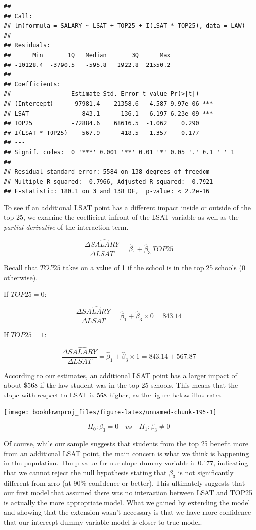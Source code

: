 \documentclass[
]{book}
\begin{document}
\begin{verbatim}
## 
## Call:
## lm(formula = SALARY ~ LSAT + TOP25 + I(LSAT * TOP25), data = LAW)
## 
## Residuals:
##      Min       1Q   Median       3Q      Max 
## -10128.4  -3790.5   -595.8   2922.8  21550.2 
## 
## Coefficients:
##                 Estimate Std. Error t value Pr(>|t|)    
## (Intercept)     -97981.4    21358.6  -4.587 9.97e-06 ***
## LSAT               843.1      136.1   6.197 6.23e-09 ***
## TOP25           -72884.6    68616.5  -1.062    0.290    
## I(LSAT * TOP25)    567.9      418.5   1.357    0.177    
## ---
## Signif. codes:  0 '***' 0.001 '**' 0.01 '*' 0.05 '.' 0.1 ' ' 1
## 
## Residual standard error: 5584 on 138 degrees of freedom
## Multiple R-squared:  0.7966, Adjusted R-squared:  0.7921 
## F-statistic: 180.1 on 3 and 138 DF,  p-value: < 2.2e-16
\end{verbatim}

To see if an additional LSAT point has a different impact inside or outside of the top 25, we examine the coefficient infront of the LSAT variable as well as the \emph{partial derivative} of the interaction term.

\[\frac{\Delta \widehat{SALARY}}{\Delta LSAT} = \hat{\beta}_1 + \hat{\beta}_3 \; TOP25\]

Recall that \(TOP25\) takes on a value of 1 if the school is in the top 25 schools (0 otherwise).

If \(TOP25 = 0\):

\[\frac{\Delta \widehat{SALARY}}{\Delta LSAT} = \hat{\beta}_1 + \hat{\beta}_3 \times 0 = 843.14\]

If \(TOP25 = 1\):

\[\frac{\Delta \widehat{SALARY}}{\Delta LSAT} = \hat{\beta}_1 + \hat{\beta}_3 \times 1 = 843.14 + 567.87\]

According to our estimates, an additional LSAT point has a larger impact of about \$568 if the law student was in the top 25 schools. This means that the slope with respect to LSAT is 568 higher, as the figure below illustrates.

\begin{center}\texttt{[image: bookdownproj\_files/figure-latex/unnamed-chunk-195-1]} \end{center}

\[H_0: \beta_3 = 0 \quad vs \quad H_1: \beta_3 \neq 0\]

Of course, while our sample suggests that students from the top 25 benefit more from an additional LSAT point, the main concern is what we think is happening in the population. The p-value for our slope dummy variable is 0.177, indicating that we cannot reject the null hypothesis stating that \(\beta_3\) is not significantly different from zero (at 90\% confidence or better). This ultimately suggests that our first model that assumed there was no interaction between LSAT and TOP25 is actually the more appropriate model. What we gained by extending the model and showing that the extension wasn't necessary is that we have more confidence that our intercept dummy variable model is closer to true model.
\end{document}
